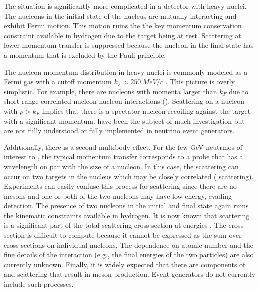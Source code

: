 The situation is significantly more complicated in a detector with heavy nuclei. The nucleons in the initial state of the nucleus are mutually interacting and exhibit Fermi motion. This motion ruins the the key momentum conservation constraint available in hydrogen due to the target being at rest. Scattering at lower momentum transfer is suppressed because the nucleon in the final state has a momentum that is excluded by the Pauli principle. 

The nucleon momentum distribution in heavy nuclei is commonly modeled as a Fermi gas with a cutoff momentum $k_F \approx \SI{250}{MeV/c}$ \cite{Smith:1972xh}.
This picture is overly simplistic.  For example,  there are nucleons with momenta larger than $k_F$ due to short-range correlated nucleon-nucleon interactions ()\cite{Bodek:2014jxa}. Scattering on a nucleon with $p>k_F$ implies that there is a spectator nucleon recoiling against the target with a significant momentum.  have been the subject of much investigation but are not fully understood or fully implemented in neutrino event generators.

Additionally, there is a second multibody effect. For the few-GeV neutrinos of interest to , the typical momentum transfer corresponds to a probe that has a wavelength on par with the size of a nucleon. In this case, the scattering can occur on two targets in the nucleus which may be closely correlated ( scattering). Experiments can easily confuse this process for  scattering since there are no mesons and one or both of the two nucleons may have low energy, evading detection. The presence of two nucleons in the initial and final state again ruins the kinematic constraints available in hydrogen. It is now known that  scattering is a significant part of the total scattering cross section at  energies \cite{Ruterbories:2018gub}. The  cross section is difficult to compute because it cannot be expressed as the sum over cross sections on individual nucleons. The dependence on atomic number and the fine details of the interaction (e.g., the final energies of the two particles) are also currently unknown. Finally, it is widely expected that there are components of  and  scattering that result in meson production. Event generators do not currently include such processes.


